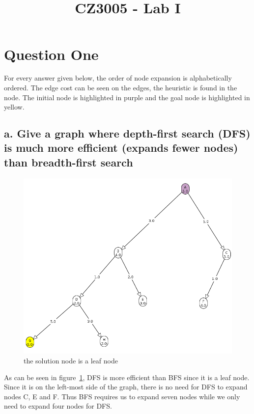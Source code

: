 \documentclass[11pt, A4]{article}
\date{} %
\title{CZ3005 - Lab I}
\begin{document}
\maketitle

\section*{Question One}

For every answer given below, the order of node expansion is alphabetically ordered. The edge cost can be seen on the edges, the heuristic is found in the node. The initial node is highlighted in purple and the goal node is highlighted in yellow. 

\subsection*{a. Give a graph where depth-first search (DFS) is much more efficient (expands fewer nodes) than breadth-first search}

\begin{figure}[H]
    \centering
    \includegraphics[width = \textwidth]{./1a.png}
    \caption{the solution node is a leaf node}
    \label{fig:1a}
\end{figure}

As can be seen in figure~\ref{fig:1a}, DFS is more efficient than BFS since it is a leaf node. Since it is on the left-most side of the graph, there is no need for DFS to expand nodes C, E and F. Thus BFS requires us to expand seven nodes while we only need to expand four nodes for DFS. 
\end{document}
